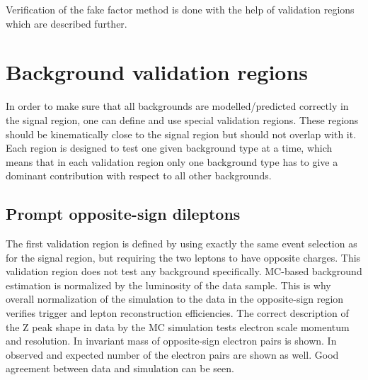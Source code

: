 Verification of the fake factor method is done with the help of validation regions which are described further.



\section{Background validation regions}

In order to make sure that all backgrounds are modelled/predicted correctly in the signal region, one can define and use special validation regions.
These regions should be kinematically close to the signal region but should not overlap with it. 
Each region is designed to test one given background type at a time,
which means that in each validation region only one background type has to give a dominant contribution with respect to all other backgrounds.

\subsection{Prompt opposite-sign dileptons}

The first validation region is defined by using exactly the same event selection as for the signal region,
but requiring the two leptons to have opposite charges. 
This validation region does not test any background specifically.
MC-based background estimation is normalized by the luminosity of the data sample.
This is why overall normalization of the simulation to the data in the opposite-sign region verifies trigger and lepton reconstruction efficiencies.
The correct description of the Z peak shape in data by the MC simulation tests electron scale momentum and resolution.
In  invariant mass of opposite-sign electron pairs is shown.
In  observed and expected number of the electron pairs are shown as well.
Good agreement between data and simulation can be seen.


